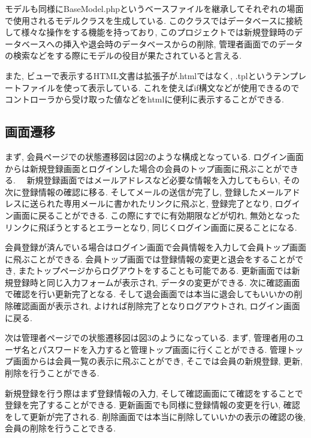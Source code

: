 \documentclass[submit,techrep]{ipsj}
\begin{document}
モデルも同様にBaseModel.phpというベースファイルを継承してそれぞれの場面で使用されるモデルクラスを生成している. 
このクラスではデータベースに接続して様々な操作をする機能を持っており, このプロジェクトでは新規登録時のデータベースへの挿入や退会時のデータベースからの削除, 管理者画面でのデータの検索などをする際にモデルの役目が果たされていると言える. 

また, ビューで表示するHTML文書は拡張子が.htmlではなく, .tplというテンプレートファイルを使って表示している. これを使えばif構文などが使用できるのでコントローラから受け取った値などをhtmlに便利に表示することができる. 

\subsection{画面遷移}
まず,  会員ページでの状態遷移図は図2のような構成となっている.  ログイン画面からは新規登録画面とログインした場合の会員のトップ画面に飛ぶことができる.　
新規登録画面ではメールアドレスなど必要な情報を入力してもらい, その次に登録情報の確認に移る. そしてメールの送信が完了し, 登録したメールアドレスに送られた専用メールに書かれたリンクに飛ぶと, 登録完了となり, ログイン画面に戻ることができる. 
この際にすでに有効期限などが切れ, 無効となったリンクに飛ぼうとするとエラーとなり, 同じくログイン画面に戻ることになる. 

会員登録が済んでいる場合はログイン画面で会員情報を入力して会員トップ画面に飛ぶことができる. 会員トップ画面では登録情報の変更と退会をすることができ, またトップページからログアウトをすることも可能である. 
更新画面では新規登録時と同じ入力フォームが表示され, データの変更ができる. 次に確認画面で確認を行い更新完了となる. 
そして退会画面では本当に退会してもいいかの削除確認画面が表示され, よければ削除完了となりログアウトされ, ログイン画面に戻る. 

次は管理者ページでの状態遷移図は図3のようになっている. まず, 管理者用のユーザ名とパスワードを入力すると管理トップ画面に行くことができる. 管理トップ画面からは会員一覧の表示に飛ぶことができ, そこでは会員の新規登録, 更新, 削除を行うことができる. 

新規登録を行う際はまず登録情報の入力, そして確認画面にて確認をすることで登録を完了することができる. 更新画面でも同様に登録情報の変更を行い, 確認をして更新が完了される. 削除画面では本当に削除していいかの表示の確認の後, 会員の削除を行うことできる. 
\end{document}
